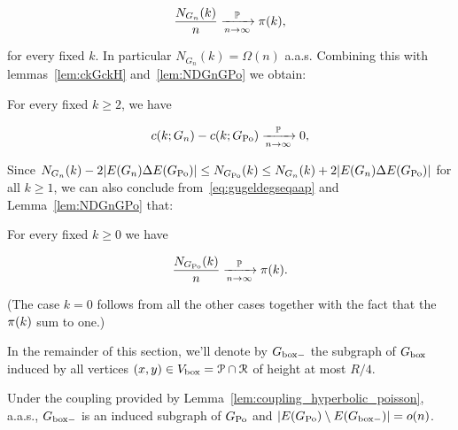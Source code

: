 \begin{equation}\label{eq:gugeldegseqaap} 
\frac{N_{G_n}(k)}{n} \xrightarrow[n\to\infty]{\mathbb{P}} {\pi}(k), 
\end{equation}

\noindent
for every fixed $k$.
In particular $N_{G_n}(k) = \Omega(n)$ a.a.s. Combining this with lemmas~\ref{lem:ckGckH} and~\ref{lem:NDGnGPo} we obtain:

\begin{corollary}\label{cor:pok} 
For every fixed $k\geq 2$, we have

$$ c(k; G_n)-c(k; G_{{\mathrm{Po}}}) \xrightarrow[n\to\infty]{\mathbb{P}} 0, $$

\end{corollary}

Since $N_{G_n}(k) - 2|E(G_n)\Delta E(G_{{\mathrm{Po}}})| \leq N_{G_{{\mathrm{Po}}}}(k) \leq N_{G_n}(k) + 2|E(G_n)\Delta E(G_{{\mathrm{Po}}})|$ for all $k\geq 1$,
we can also conclude from~\eqref{eq:gugeldegseqaap} and Lemma~\ref{lem:NDGnGPo} that:


\begin{corollary}\label{cor:NGPok} 
For every fixed $k\geq 0$ we have 

$$ \frac{N_{G_{{\mathrm{Po}}}}(k)}{n} \xrightarrow[n\to\infty]{\mathbb{P}} {\pi}(k). $$

\end{corollary}

\noindent
(The case $k=0$ follows from all the other cases together with the fact that the ${\pi}(k)$ sum to one.)

In the remainder of this section, we'll denote by $G_{\mathrm{box}-}$ the subgraph of $G_{\mathrm{box}}$ induced by all 
vertices $(x,y) \in V_{\text{box}} = {\mathcal P} \cap {\mathcal R}$ of height at most $R/4$.

\begin{lemma}
Under the coupling provided by Lemma~\ref{lem:coupling_hyperbolic_poisson}, a.a.s., 
$G_{\mathrm{box}-}$ is an induced subgraph of $G_{{\mathrm{Po}}}$ and $|E(G_{{\mathrm{Po}}}) \setminus E(G_{\mathrm{box}-})| = o(n)$.
\end{lemma}

